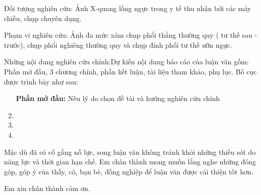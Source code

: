 Đối tượng nghiên cứu: Ảnh X-quang lồng ngực trong y tế thu nhận bởi các máy chiếu, chụp chuyên dụng.

Phạm vi nghiên cứu: Ảnh đa mức xám chụp phổi thẳng thường quy ( tư thế sau - trước), chụp phổi nghiêng thường quy và chụp đỉnh phổi tư thế ưỡn ngực.

Những nội dung nghiên cứu chính:Dự kiến nội dung báo cáo của luận văn gồm: Phần mở đầu, 3 chương chính, phần kết luận, tài liệu tham khảo, phụ lục. Bố cục được trình bày như sau:
\begin{enumerate}[label=\bfseries Chương \arabic*:]
	\item[\bfseries Phần mở đầu:] Nêu lý do chọn đề tài và hướng nghiên cứu chính
	\item \tenchuongi 
	\item \tenchuongii
	\item \tenchuongiii
\end{enumerate}

Mặc dù đã có cố gắng nỗ lực, song luận văn không tránh khỏi những thiếu sót do năng lực và thời gian hạn chế. Em chân thành mong muốn lắng nghe những đóng góp, góp ý của thầy, cô, bạn bè, đồng nghiệp để luận văn được cải thiện tốt hơn.

Em xin chân thành cảm ơn.
